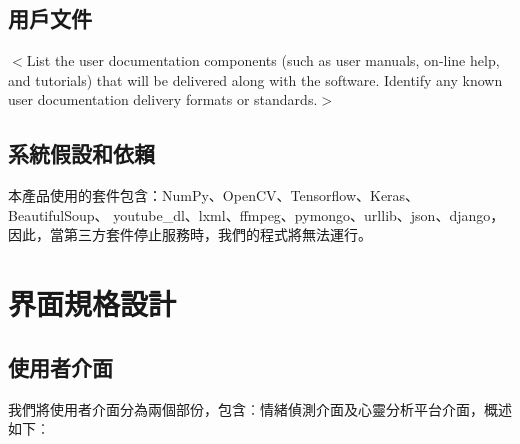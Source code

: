 \documentclass[12pt]{scrreprt}
\begin{document}
\section{用戶文件}
$<$List the user documentation components (such as user manuals, on-line help, 
and tutorials) that will be delivered along with the software. Identify any 
known user documentation delivery formats or standards.$>$
\section{系統假設和依賴}

本產品使用的套件包含：NumPy、OpenCV、Tensorflow、Keras、BeautifulSoup、
youtube_dl、lxml、ffmpeg、pymongo、urllib、json、django，因此，當第三方套件停止服務時，我們的程式將無法運行。



\chapter{界面規格設計}

\section{使用者介面}

我們將使用者介面分為兩個部份，包含︰情緒偵測介面及心靈分析平台介面，概述如下︰
\end{document}
